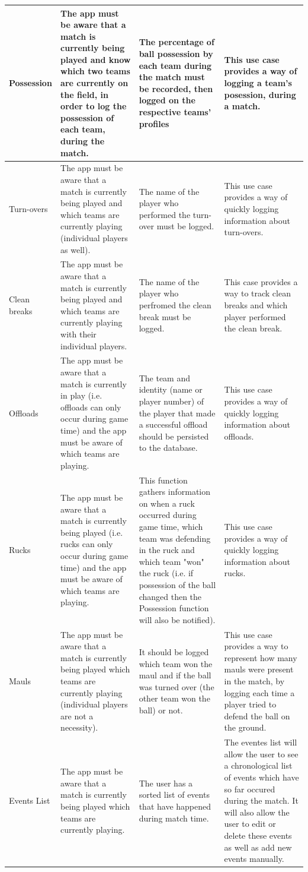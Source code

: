 \documentclass[a4paper,12pt]{report}
\begin{document}
\begin{center}
\begin{longtable}{| p{3cm} | p{4cm} | p{4cm} | p{4cm} |}
    Possession & The app must be aware that a match is currently being played and know which two teams are currently on the field, in order to log the possession of each team, during the match. & The percentage of ball possession by each team during the match must be recorded, then logged on the respective teams' profiles & This use case provides a way of logging a team's posession, during a match.\\ \hline
    Turn-overs & The app must be aware that a match is currently being played and which teams are currently playing (individual players as well). & The name of the player who performed the turn-over must be logged. &  This use case provides a way of quickly logging information about turn-overs.\\ \hline
    Clean breaks & The app must be aware that a match is currently being played and which teams are currently playing with their individual players. & The name of the player who perfromed the clean break must be logged. & This case provides a way to track clean breaks and which player performed the clean break.\\ \hline
    Offloads & The app must be aware that a match is currently in play (i.e. offloads can only occur during game time) and the app must be aware of which teams are playing. & The team and identity (name or player number) of the player that made a successful offload should be persisted to the database. & This use case provides a way of quickly logging information about offloads.\\ \hline
    Rucks & The app must be aware that a match is currently being played (i.e. rucks can only occur during game time) and the app must be aware of which teams are playing. & This function gathers information on when a ruck occurred during game time, which team was defending in the ruck and which team "won" the ruck (i.e. if possession of the ball changed then the Possession function will also be notified). & This use case provides a way of quickly logging information about rucks.\\ \hline
    Mauls & The app must be aware that a match is currently being played which teams are currently playing (individual players are not a necessity). & It should be logged which team won the maul and if the ball was turned over (the other team won the ball) or not. & This use case provides a way to represent how many mauls were present in the match, by logging each time a player tried to defend the ball on the ground.\\ \hline
    Events List & The app must be aware that a match is currently being played which teams are currently playing. & The user has a sorted list of events that have happened during match time. & The eventes list will allow the user to see a chronological list of events which have so far occured during the match. It will also allow the user to edit or delete these events as well as add new events manually.\\ \hline

    \hline
  \end{longtable}
\end{center}
\newpage
\end{document}
